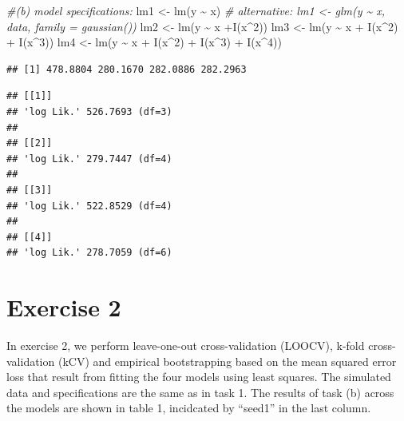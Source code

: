 \documentclass[
]{article}
\newenvironment{Shaded}{\begin{snugshade}}{\end{snugshade}}
\newcommand{\CommentTok}[1]{\textcolor[rgb]{0.56,0.35,0.01}{\textit{#1}}}
\newcommand{\DecValTok}[1]{\textcolor[rgb]{0.00,0.00,0.81}{#1}}
\newcommand{\FunctionTok}[1]{\textcolor[rgb]{0.00,0.00,0.00}{#1}}
\newcommand{\NormalTok}[1]{#1}
\newcommand{\OtherTok}[1]{\textcolor[rgb]{0.56,0.35,0.01}{#1}}
\newcommand{\SpecialCharTok}[1]{\textcolor[rgb]{0.00,0.00,0.00}{#1}}
\begin{document}
\begin{Shaded}
\begin{Highlighting}[]
\CommentTok{\#(b) model specifications:}
\NormalTok{lm1 }\OtherTok{\textless{}{-}} \FunctionTok{lm}\NormalTok{(y }\SpecialCharTok{\textasciitilde{}}\NormalTok{ x) }\CommentTok{\# alternative: lm1 \textless{}{-} glm(y \textasciitilde{} x, data, family = gaussian()) }
\NormalTok{lm2 }\OtherTok{\textless{}{-}} \FunctionTok{lm}\NormalTok{(y }\SpecialCharTok{\textasciitilde{}}\NormalTok{ x }\SpecialCharTok{+}\FunctionTok{I}\NormalTok{(x}\SpecialCharTok{\^{}}\DecValTok{2}\NormalTok{))}
\NormalTok{lm3 }\OtherTok{\textless{}{-}} \FunctionTok{lm}\NormalTok{(y }\SpecialCharTok{\textasciitilde{}}\NormalTok{ x }\SpecialCharTok{+} \FunctionTok{I}\NormalTok{(x}\SpecialCharTok{\^{}}\DecValTok{2}\NormalTok{) }\SpecialCharTok{+} \FunctionTok{I}\NormalTok{(x}\SpecialCharTok{\^{}}\DecValTok{3}\NormalTok{))}
\NormalTok{lm4 }\OtherTok{\textless{}{-}} \FunctionTok{lm}\NormalTok{(y }\SpecialCharTok{\textasciitilde{}}\NormalTok{ x }\SpecialCharTok{+} \FunctionTok{I}\NormalTok{(x}\SpecialCharTok{\^{}}\DecValTok{2}\NormalTok{) }\SpecialCharTok{+} \FunctionTok{I}\NormalTok{(x}\SpecialCharTok{\^{}}\DecValTok{3}\NormalTok{) }\SpecialCharTok{+} \FunctionTok{I}\NormalTok{(x}\SpecialCharTok{\^{}}\DecValTok{4}\NormalTok{))}
\end{Highlighting}
\end{Shaded}

\begin{verbatim}
## [1] 478.8804 280.1670 282.0886 282.2963
\end{verbatim}

\begin{verbatim}
## [[1]]
## 'log Lik.' 526.7693 (df=3)
## 
## [[2]]
## 'log Lik.' 279.7447 (df=4)
## 
## [[3]]
## 'log Lik.' 522.8529 (df=4)
## 
## [[4]]
## 'log Lik.' 278.7059 (df=6)
\end{verbatim}

\hypertarget{exercise-2}{%
\section{Exercise 2}\label{exercise-2}}

In exercise 2, we perform leave-one-out cross-validation (LOOCV), k-fold
cross-validation (kCV) and empirical bootstrapping based on the mean
squared error loss that result from fitting the four models using least
squares. The simulated data and specifications are the same as in task
1. The results of task (b) across the models are shown in table 1,
incidcated by ``seed1'' in the last column.
\end{document}
